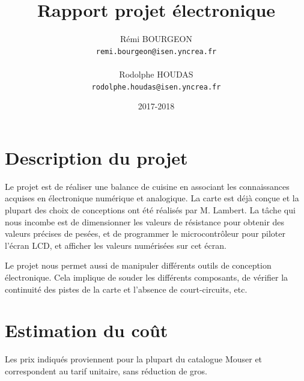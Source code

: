 \documentclass[a4paper,11pt,titlepage]{article}
\title{Rapport projet électronique}
\author{Rémi BOURGEON\\
\texttt{remi.bourgeon@isen.yncrea.fr}\\\\
Rodolphe HOUDAS\\
\texttt{rodolphe.houdas@isen.yncrea.fr}}
\date{2017-2018}
\begin{document}
\maketitle
\tableofcontents
\newpage


\section{Description du projet}

Le projet est de réaliser une balance de cuisine en associant les connaissances acquises en électronique numérique et analogique. La carte est déjà conçue et la plupart des choix de conceptions ont été réalisés par M. Lambert. La tâche qui nous incombe est de dimensionner les valeurs de résistance pour obtenir des valeurs précises de pesées, et de programmer le microcontrôleur pour piloter l'écran LCD, et afficher les valeurs numérisées sur cet écran. 

Le projet nous permet aussi de manipuler différents outils de conception électronique. Cela implique de souder les différents composants, de vérifier la continuité des pistes de la carte et l'absence de court-circuits, etc. 

\section{Estimation du coût}

Les prix indiqués proviennent pour la plupart du catalogue Mouser et correspondent au tarif unitaire, sans réduction de gros.\\
\end{document}
